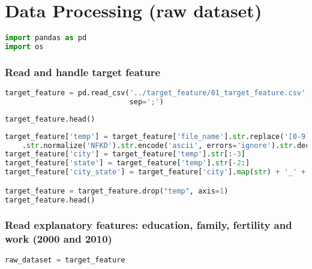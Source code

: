 \hypertarget{data-processing-raw-dataset}{%
\section{Data Processing (raw
dataset)}\label{data-processing-raw-dataset}}

\begin{lstlisting}[language=Python]
import pandas as pd
import os
\end{lstlisting}

\hypertarget{read-and-handle-target-feature}{%
\subsubsection{Read and handle target
feature}\label{read-and-handle-target-feature}}

\begin{lstlisting}[language=Python]
target_feature = pd.read_csv('../target_feature/01_target_feature.csv',
                             sep=';')
\end{lstlisting}

\begin{lstlisting}[language=Python]
target_feature.head()
\end{lstlisting}

\begin{lstlisting}[language=Python]
target_feature['temp'] = target_feature['file_name'].str.replace('[0-9]|.pdf|-', ' ', regex=True)\
    .str.normalize('NFKD').str.encode('ascii', errors='ignore').str.decode('utf-8').str.lower().str.strip()
target_feature['city'] = target_feature['temp'].str[:-3]
target_feature['state'] = target_feature['temp'].str[-2:]
target_feature['city_state'] = target_feature['city'].map(str) + '_' + target_feature['state']

target_feature = target_feature.drop("temp", axis=1)
target_feature.head()
\end{lstlisting}

\hypertarget{read-explanatory-features-education-family-fertility-and-work-2000-and-2010}{%
\subsubsection{Read explanatory features: education, family, fertility
and work (2000 and
2010)}\label{read-explanatory-features-education-family-fertility-and-work-2000-and-2010}}

\begin{lstlisting}[language=Python]
raw_dataset = target_feature
\end{lstlisting}

